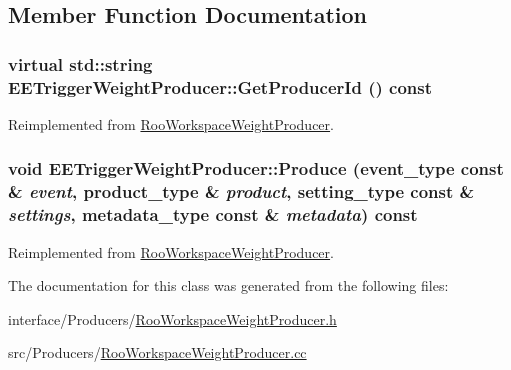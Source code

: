 \subsection{Member Function Documentation}
\hypertarget{classEETriggerWeightProducer_aa3ee349e72e7e9b3b64c582e5cc0d834}{
\subsubsection[{GetProducerId}]{\setlength{\rightskip}{0pt plus 5cm}virtual std::string EETriggerWeightProducer::GetProducerId () const}}
\label{classEETriggerWeightProducer_aa3ee349e72e7e9b3b64c582e5cc0d834}


Reimplemented from \hyperlink{classRooWorkspaceWeightProducer_a40f7cc577a5dbf0504fc9f3c1670a0a2}{RooWorkspaceWeightProducer}.\hypertarget{classEETriggerWeightProducer_a1b3bd9104cf404304cecc13e4425dc07}{
\subsubsection[{Produce}]{\setlength{\rightskip}{0pt plus 5cm}void EETriggerWeightProducer::Produce (event\_\-type const \& {\em event}, \/  product\_\-type \& {\em product}, \/  setting\_\-type const \& {\em settings}, \/  metadata\_\-type const \& {\em metadata}) const}}
\label{classEETriggerWeightProducer_a1b3bd9104cf404304cecc13e4425dc07}


Reimplemented from \hyperlink{classRooWorkspaceWeightProducer_afd139b8380a91e8aaa72066a8a826350}{RooWorkspaceWeightProducer}.

The documentation for this class was generated from the following files:\begin{DoxyCompactItemize}
\item 
interface/Producers/\hyperlink{RooWorkspaceWeightProducer_8h}{RooWorkspaceWeightProducer.h}\item 
src/Producers/\hyperlink{RooWorkspaceWeightProducer_8cc}{RooWorkspaceWeightProducer.cc}\end{DoxyCompactItemize}
